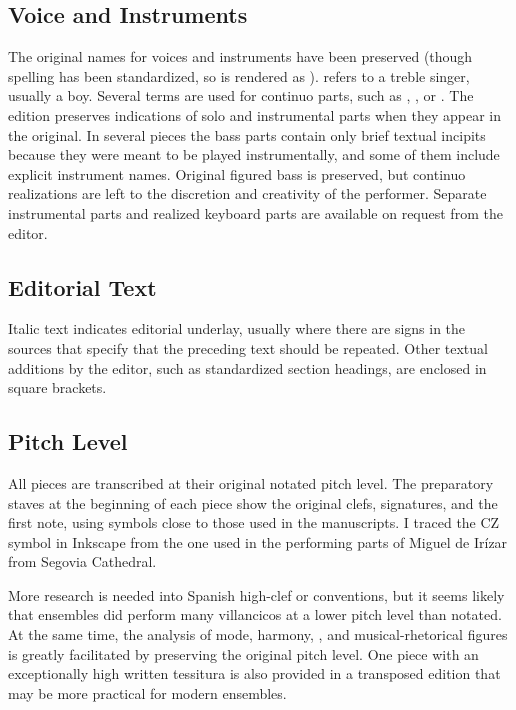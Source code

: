 \subsection{Voice and Instruments}
The original names for voices and instruments have been preserved (though
spelling has been standardized, so  is rendered as
).
 refers to a treble singer, usually a boy.
Several terms are used for continuo parts, such as ,
, or .
The edition preserves indications of solo and instrumental parts when they
appear in the original.
In several pieces the bass parts contain only brief textual incipits because
they were meant to be played instrumentally, and some of them include explicit
instrument names.
Original figured bass is preserved, but continuo realizations are left to the
discretion and creativity of the performer.
Separate instrumental parts and realized keyboard parts are available on request
from the editor.

\subsection{Editorial Text}
Italic text indicates editorial underlay, usually where there are signs in the
sources that specify that the preceding text should be repeated.
Other textual additions by the editor, such as standardized section headings, 
are enclosed in square brackets.

\subsection{Pitch Level}
All pieces are transcribed at their original notated pitch level.
The preparatory staves at the beginning of each piece show the original clefs, 
signatures, and the first note, using symbols close to those used in the
manuscripts.  I traced the CZ symbol in Inkscape from the one used in the
performing parts of Miguel de Irízar from Segovia Cathedral.

More research is needed into Spanish high-clef or 
conventions, but it seems likely that ensembles did perform many villancicos
at a lower pitch level than notated.
At the same time, the analysis of mode, harmony, , and
musical-rhetorical figures is greatly facilitated by preserving the original
pitch level.
One piece with an exceptionally high written tessitura is also provided in a
transposed edition that may be more practical for modern ensembles.

